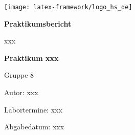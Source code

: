 \def\author{xxx}
\def\module{xxx}
\def\experiment{xxx}
\def\group{xxx}
\def\submissionDate{xxx}
\def\labDate{xxx}

\begin{titlepage}
    \centering
    \texttt{[image: latex-framework/logo\_hs\_de]}
    \vspace{2cm}
    
    \begin{Huge}
        \textbf{Praktikumsbericht}
    \end{Huge}
    \vspace{3cm}

    \begin{huge}
        \module \par
        \textbf{Praktikum \experiment} \par
    \end{huge}
    \vspace{2cm}

    \begin{Large}
        Gruppe 8 \par
        Autor: \author \par
    \end{Large}
    
    \vspace{2cm}

    \begin{Large}
        Labortermine: \labDate \par
        Abgabedatum: \submissionDate \par
    \end{Large}

    \restoregeometry
\end{titlepage}